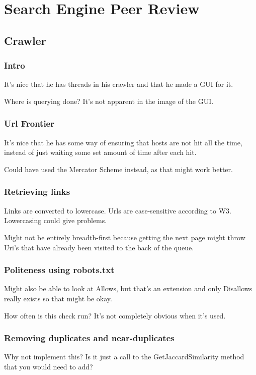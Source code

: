 


\chapter*{Search Engine Peer Review}
\section*{Crawler}
    \subsection{Intro} 
    It's nice that he has threads in his crawler and that he made a GUI for it. 

    Where is querying done? It's not apparent in the image of the GUI.

    \subsection{Url Frontier}
    It's nice that he has some way of ensuring that hosts are not hit all the time, instead of just waiting some set amount of time after each hit. 

    Could have used the Mercator Scheme instead, as that might work better.

    \subsection{Retrieving links}
    Links are converted to lowercase. Urls are case-sensitive according to W3. Lowercasing could give problems.
    
    Might not be entirely breadth-first because getting the next page might throw Uri's that have already been visited to the back of the queue.

    \subsection{Politeness using robots.txt}
    Might also be able to look at Allows, but that's an extension and only Disallows really exists so that might be okay.
    
    How often is this check run? It's not completely obvious when it's used.
    
    \subsection{Removing duplicates and near-duplicates}
    Why not implement this? Is it just a call to the GetJaccardSimilarity method that you would need to add?
    
